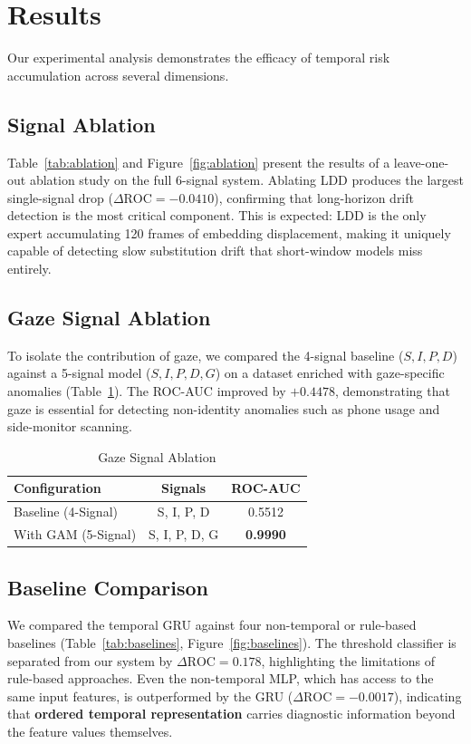\documentclass[conference]{IEEEtran}
\begin{document}
\section{Results}

Our experimental analysis demonstrates the efficacy of temporal risk accumulation across several dimensions.

\subsection{Signal Ablation}
Table~\ref{tab:ablation} and Figure~\ref{fig:ablation} present the results of a leave-one-out ablation study on the full 6-signal system. Ablating LDD produces the largest single-signal drop ($\Delta\text{ROC} = -0.0410$), confirming that long-horizon drift detection is the most critical component. This is expected: LDD is the only expert accumulating 120 frames of embedding displacement, making it uniquely capable of detecting slow substitution drift that short-window models miss entirely.

\subsection{Gaze Signal Ablation}
To isolate the contribution of gaze, we compared the 4-signal baseline ($S, I, P, D$) against a 5-signal model ($S, I, P, D, G$) on a dataset enriched with gaze-specific anomalies (Table~\ref{tab:ablation_v2}). The ROC-AUC improved by $+0.4478$, demonstrating that gaze is essential for detecting non-identity anomalies such as phone usage and side-monitor scanning.

\begin{table}[!t]
\caption{Gaze Signal Ablation}
\label{tab:ablation_v2}
\centering
\begin{tabular}{lcc}
\toprule
\textbf{Configuration} & \textbf{Signals} & \textbf{ROC-AUC} \\
\midrule
Baseline (4-Signal) & S, I, P, D & 0.5512 \\
With GAM (5-Signal) & S, I, P, D, G & \textbf{0.9990} \\
\bottomrule
\end{tabular}
\end{table}

\subsection{Baseline Comparison}
We compared the temporal GRU against four non-temporal or rule-based baselines (Table~\ref{tab:baselines}, Figure~\ref{fig:baselines}). The threshold classifier is separated from our system by $\Delta\text{ROC} = 0.178$, highlighting the limitations of rule-based approaches. Even the non-temporal MLP, which has access to the same input features, is outperformed by the GRU ($\Delta\text{ROC} = -0.0017$), indicating that \textbf{ordered temporal representation} carries diagnostic information beyond the feature values themselves.
\end{document}
